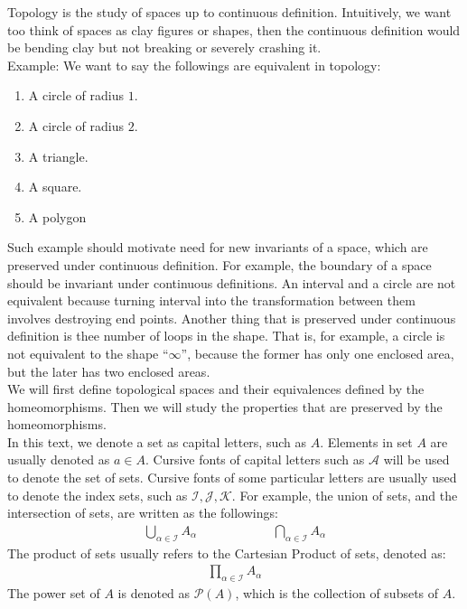 \documentclass[11pt]{book}
\theoremstyle{break}
\theoremstyle{break}
\newcommand{\Power}{\mathcal{P}}
\newcommand{\example}{\color{green}Example: \color{black}}
\begin{document}
\newpage 
\tableofcontents
{}

\newpage
\setcounter{page}{1}
\vspace*{\fill}


\newpage
Topology is the study of spaces up to continuous definition. Intuitively, we want too think of spaces as clay figures or shapes, then the continuous definition would be bending clay but not breaking or severely crashing it. \\

\example We want to say the followings are equivalent in topology:
\begin{enumerate}[topsep=3pt,itemsep=-1ex,partopsep=1ex,parsep=1ex]
\item A circle of radius $1$.
\item A circle of radius $2$.
\item A triangle.
\item A square.
\item A polygon
\end{enumerate}
Such example should motivate need for new invariants of a space, which are preserved under continuous definition. For example, the boundary of a space should be invariant under continuous definitions. An interval and a circle are not equivalent because turning interval into the transformation between them involves destroying end points. Another thing that is preserved under continuous definition is thee number of loops in the shape. That is, for example, a circle is not equivalent to the shape ``$\infty$'', because the former has only one enclosed area, but the later has two enclosed areas. \\

We will first define topological spaces and their equivalences defined by the homeomorphisms. Then we will study  the properties that are preserved by the homeomorphisms.\\

In this text, we denote a set as capital letters, such as $A$. Elements in set $A$ are usually denoted as $a \in A$. Cursive fonts of capital letters such as $\mathcal{A}$ will be used to denote the set of sets. Cursive fonts of some particular letters are usually used to denote the index sets, such as $\mathcal{I}, \mathcal{J}, \mathcal{K}$. For example, the union of sets, and the intersection of sets, are written as the followings:
\begin{align*}
\bigcup_{\alpha \in \mathcal{I}} A_\alpha \qquad\qquad\qquad \bigcap_{\alpha \in \mathcal{I}}A_{\alpha}
\end{align*}
The product of sets usually refers to the Cartesian Product of sets, denoted as:
\begin{align*}
\prod_{\alpha \in \mathcal{I}} A_{\alpha}
\end{align*}
The power set of $A$ is denoted as $\Power(A)$, which is the collection of subsets of $A$. \\
\end{document}
